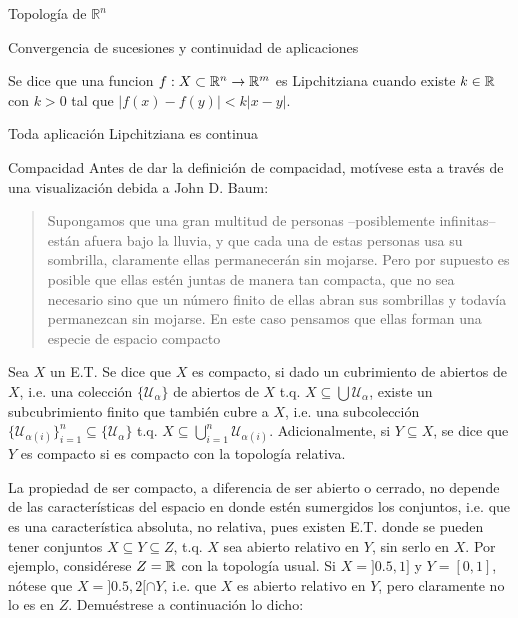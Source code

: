 \begin{chapter}{Topología de $\mathbb{R}^n$}
\begin{section}{Convergencia de sucesiones y continuidad de aplicaciones}
\begin{defn}
Se dice que una funcion $f: X \subset \mathbb{R}^n \to \mathbb{R}^m$ es Lipchitziana cuando existe $k \in \mathbb{R}$ con $k > 0$ tal que $|f(x) - f(y)| < k|x - y|$.
\end{defn}

\begin{lema}
Toda aplicación Lipchitziana es continua
\end{lema}

\end{section}

\begin{section}{Compacidad}
Antes de dar la definición de compacidad, motívese esta a través de una visualización debida a John D. Baum: 

\begin{quote}
    Supongamos que una gran multitud de personas --posiblemente infinitas-- están afuera bajo la lluvia, y que cada una de estas personas usa su sombrilla, claramente ellas permanecerán sin mojarse. Pero por supuesto es posible que ellas estén juntas de manera tan compacta, que no sea necesario sino que un número finito de ellas abran sus sombrillas y todavía permanezcan sin mojarse. En este caso pensamos que ellas forman una especie de espacio compacto
\end{quote}

\begin{defn}
Sea $X$ un E.T. Se dice que $X$ es compacto, si dado un cubrimiento de abiertos de $X$, i.e. una colección $\{\mathcal{U}_\alpha\}$ de abiertos de $X$ t.q. $X\subseteq\bigcup\mathcal{U}_\alpha$, existe un subcubrimiento finito que también cubre a $X$, i.e. una subcolección $\{\mathcal{U}_{\alpha(i)}\}_{i=1}^n\subseteq\{\mathcal{U}_\alpha\}$ t.q. $X\subseteq\bigcup_{i=1}^n\mathcal{U}_{\alpha(i)}$. Adicionalmente, si $Y\subseteq X$, se dice que $Y$ es compacto si es compacto con la topología relativa.
\end{defn}

La propiedad de ser compacto, a diferencia de ser abierto o cerrado, no depende de las características del espacio en donde estén sumergidos los conjuntos, i.e. que es una característica absoluta, no relativa, pues existen E.T. donde se pueden tener conjuntos $X\subseteq Y\subseteq Z$, t.q. $X$ sea abierto relativo en $Y$, sin serlo en $X$. Por ejemplo, considérese $Z=\mathbb{R}$ con la topología usual. Si $X=]0.5,1]$ y $Y=[0,1]$, nótese que $X=]0.5,2[\cap Y$, i.e. que $X$ es abierto relativo en $Y$, pero claramente no lo es en $Z$. Demuéstrese a continuación lo dicho:


\end{section}
\end{chapter}
